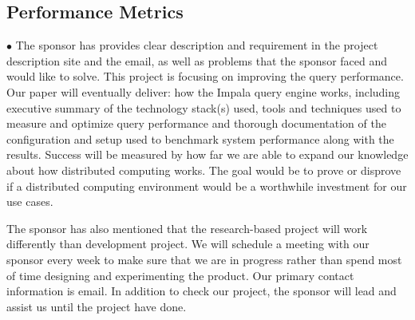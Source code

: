 \documentclass[letterpaper,10pt,fleqn,draftclsnofoot,onecolumn]{IEEEtran}
\begin{document}
	\subsection{Performance Metrics}
	$\bullet$ The sponsor has provides clear description and requirement in the project description site and the email, as well as problems that the sponsor faced and would like to solve. This project is focusing on improving the query performance. Our paper will eventually deliver: how the Impala query engine works, including executive summary of the technology stack(s) used, tools and techniques used to measure and optimize query performance and thorough documentation of the configuration and setup used to benchmark system performance along with the results. Success will be measured by how far we are able to expand our knowledge about how distributed computing works. The goal would be to prove or disprove if a distributed computing environment would be a worthwhile investment for our use cases. 

The sponsor has also mentioned that the research-based project will work differently than development project. We will schedule a meeting with our sponsor every week to make sure that we are in progress rather than spend most of time designing and experimenting the product. Our primary contact information is email. In addition to check our project, the sponsor will lead and assist us until the project have done. 



	
\end{document}
